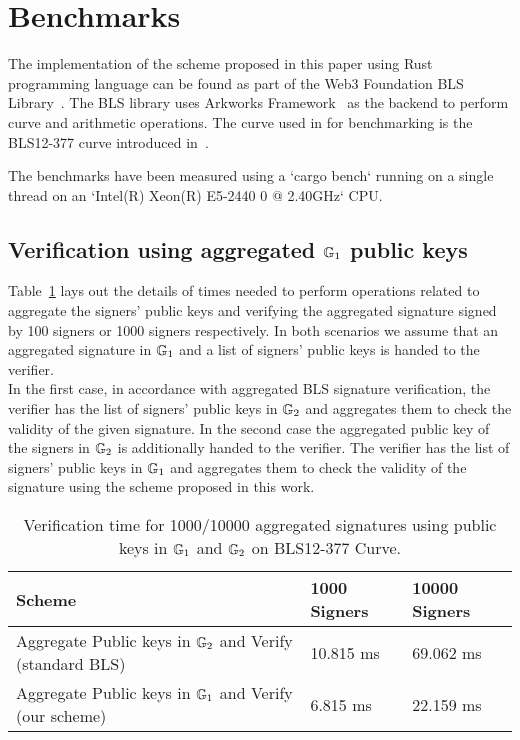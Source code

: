 \section{Benchmarks}
\label{sec:benchmarks}

The implementation of the scheme proposed in this paper using Rust programming language can be found as part of the Web3 Foundation BLS Library~\cite{web3.bls.2022}. The BLS library uses Arkworks Framework~\cite{arkworks.2022} 
as the backend to perform curve and arithmetic operations. The curve used in for benchmarking is the BLS12-377 curve introduced in~\cite{bowe20_zexe}.

The benchmarks have been measured using a `cargo bench` running on a single thread on an `Intel(R) Xeon(R) E5-2440 0 @ 2.40GHz` CPU.

\subsection{Verification using aggregated $\mathbb{G}_{1}$ public keys}
\label{sec:benchmark_aggregate_verify}

Table~\ref{tab:aggregated_signature_bench} lays out the details of times needed to perform operations related to aggregate the signers' public keys and verifying the aggregated signature signed by 100 signers or 1000 signers respectively. In both scenarios we assume that an aggregated signature in $\mathbb{G}_{1}$ and a list of signers' public keys is handed to the verifier. \\

In the first case, in accordance with aggregated BLS signature verification, the verifier has the list of signers' public keys in $\mathbb{G}_{2}$ and aggregates them to check the validity of the given signature.
In the second case the aggregated public key of the signers in $\mathbb{G}_{2}$ is additionally handed to the verifier. The verifier has the list of signers' public keys in $\mathbb{G}_{1}$ and aggregates them to check the validity of the signature using the scheme proposed in this work.

\begin{table}[h!]
\begin{tabular}{| l | l | l |}

\hline

 Scheme & \textbf {1000 Signers} & \textbf{10000 Signers} 	 \\
\hline
Aggregate Public keys in $\mathbb{G}_{2}$ and Verify (standard BLS) & 10.815 ms & 69.062 ms \\
\hline
Aggregate Public keys in $\mathbb{G}_{1}$ and Verify (our scheme)  & 6.815 ms & 22.159 ms \\
\hline
\end{tabular}
\caption{Verification time for 1000/10000 aggregated signatures using public keys in $\mathbb{G}_{1}$ and $\mathbb{G}_{2}$ on BLS12-377 Curve.}
\label{tab:aggregated_signature_bench}
\end{table}

